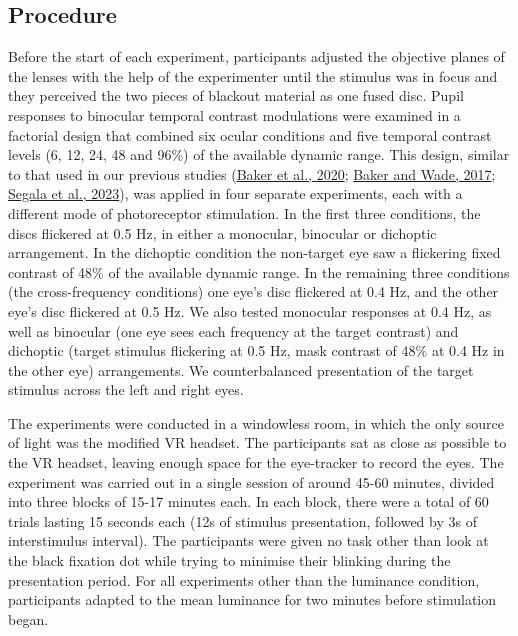 \documentclass[
]{article}
\begin{document}
\hypertarget{procedure}{%
\subsection{Procedure}\label{procedure}}

Before the start of each experiment, participants adjusted the objective planes of the lenses with the help of the experimenter until the stimulus was in focus and they perceived the two pieces of blackout material as one fused disc. Pupil responses to binocular temporal contrast modulations were examined in a factorial design that combined six ocular conditions and five temporal contrast levels (6, 12, 24, 48 and 96\%) of the available dynamic range. This design, similar to that used in our previous studies (\protect\hyperlink{ref-Baker2020}{Baker et al., 2020}; \protect\hyperlink{ref-Baker2017}{Baker and Wade, 2017}; \protect\hyperlink{ref-Segala2023}{Segala et al., 2023}), was applied in four separate experiments, each with a different mode of photoreceptor stimulation. In the first three conditions, the discs flickered at 0.5 Hz, in either a monocular, binocular or dichoptic arrangement. In the dichoptic condition the non-target eye saw a flickering fixed contrast of 48\% of the available dynamic range. In the remaining three conditions (the cross-frequency conditions) one eye's disc flickered at 0.4 Hz, and the other eye's disc flickered at 0.5 Hz. We also tested monocular responses at 0.4 Hz, as well as binocular (one eye sees each frequency at the target contrast) and dichoptic (target stimulus flickering at 0.5 Hz, mask contrast of 48\% at 0.4 Hz in the other eye) arrangements. We counterbalanced presentation of the target stimulus across the left and right eyes.

The experiments were conducted in a windowless room, in which the only source of light was the modified VR headset. The participants sat as close as possible to the VR headset, leaving enough space for the eye-tracker to record the eyes. The experiment was carried out in a single session of around 45-60 minutes, divided into three blocks of 15-17 minutes each. In each block, there were a total of 60 trials lasting 15 seconds each (12s of stimulus presentation, followed by 3s of interstimulus interval). The participants were given no task other than look at the black fixation dot while trying to minimise their blinking during the presentation period. For all experiments other than the luminance condition, participants adapted to the mean luminance for two minutes before stimulation began.
\end{document}
